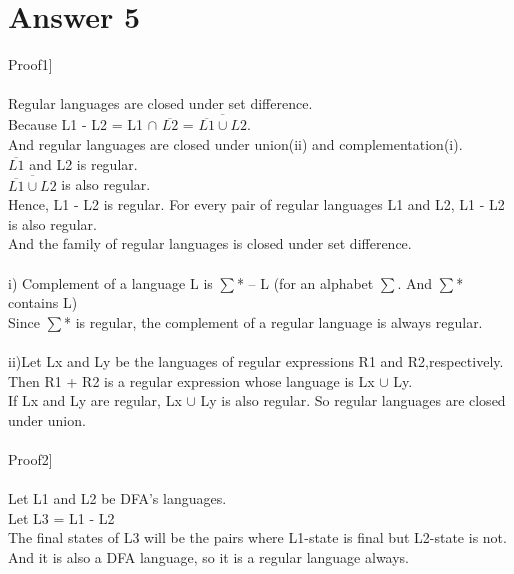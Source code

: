 \documentclass[12pt]{article}
\begin{document}
\section*{Answer 5}
Proof1] \\
\\
Regular languages are closed under set difference. \\
Because L1 - L2 = L1 $\cap$ $\overline{L2}$ = $\overline{ \overline{L1} \cup L2}$. \\
And regular languages are closed under union(ii) and complementation(i). \\
$\overline{L1}$ and L2 is regular. \\
$\overline{ \overline{L1} \cup L2}$ is also regular. \\
Hence, L1 - L2 is regular. For every pair of regular languages L1 and L2, L1 - L2 is also regular. \\
And the family of regular languages is closed under set difference. \\
\\
i) Complement of a language L is $\sum$* – L (for an alphabet $\sum$. And $\sum$* contains L) \\
Since $\sum$* is regular, the complement of a regular language is always regular. \\
\\
ii)Let Lx and Ly be the languages of regular expressions R1 and R2,respectively. \\
Then R1 + R2 is a regular expression whose language is Lx $\cup$ Ly. \\ 
If Lx and Ly are regular, Lx $\cup$ Ly is also regular. So regular languages are closed under union. \\
\\
Proof2] \\
\\
Let L1 and L2 be DFA’s languages. \\
Let L3 = L1 - L2 \\
The final states of L3 will be the pairs where L1-state is final but L2-state is not. \\
And it is also a DFA language, so it is a regular language always. \\  
\end{document}

